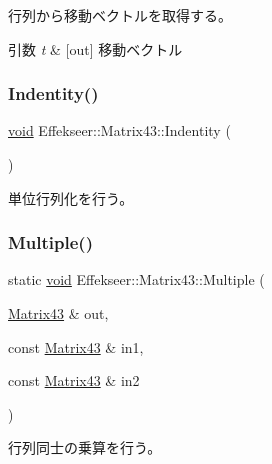 行列から移動ベクトルを取得する。 


\begin{DoxyParams}{引数}
{\em t} & \mbox{[}out\mbox{]} 移動ベクトル \\
\hline
\end{DoxyParams}
\mbox{\label{struct_effekseer_1_1_matrix43_a17bf676d8a89baaa9d40637d6a643885}} 
\subsubsection{\texorpdfstring{Indentity()}{Indentity()}}
{\footnotesize\ttfamily \mbox{\hyperlink{namespace_effekseer_ab34c4088e512200cf4c2716f168deb56}{void}} Effekseer\+::\+Matrix43\+::\+Indentity (\begin{DoxyParamCaption}{ }\end{DoxyParamCaption})}



単位行列化を行う。 

\mbox{\label{struct_effekseer_1_1_matrix43_accff4bf845b1bfec3f6d8fb7e3e60516}} 
\subsubsection{\texorpdfstring{Multiple()}{Multiple()}}
{\footnotesize\ttfamily static \mbox{\hyperlink{namespace_effekseer_ab34c4088e512200cf4c2716f168deb56}{void}} Effekseer\+::\+Matrix43\+::\+Multiple (\begin{DoxyParamCaption}\item[{\mbox{\hyperlink{struct_effekseer_1_1_matrix43}{Matrix43}} \&}]{out,  }\item[{const \mbox{\hyperlink{struct_effekseer_1_1_matrix43}{Matrix43}} \&}]{in1,  }\item[{const \mbox{\hyperlink{struct_effekseer_1_1_matrix43}{Matrix43}} \&}]{in2 }\end{DoxyParamCaption})\hspace{0.3cm}{\ttfamily [static]}}



行列同士の乗算を行う。 


